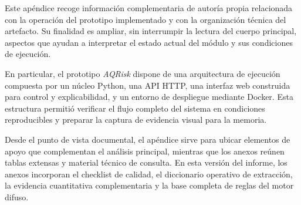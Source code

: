 

Este apéndice recoge información complementaria de autoría propia relacionada con la operación del prototipo implementado y con la organización técnica del artefacto. Su finalidad es ampliar, sin interrumpir la lectura del cuerpo principal, aspectos que ayudan a interpretar el estado actual del módulo y sus condiciones de ejecución.

En particular, el prototipo \textit{AQRisk} dispone de una arquitectura de ejecución compuesta por un núcleo Python, una API HTTP, una interfaz web construida para control y explicabilidad, y un entorno de despliegue mediante Docker. Esta estructura permitió verificar el flujo completo del sistema en condiciones reproducibles y preparar la captura de evidencia visual para la memoria.

Desde el punto de vista documental, el apéndice sirve para ubicar elementos de apoyo que complementan el análisis principal, mientras que los anexos reúnen tablas extensas y material técnico de consulta. En esta versión del informe, los anexos incorporan el checklist de calidad, el diccionario operativo de extracción, la evidencia cuantitativa complementaria y la base completa de reglas del motor difuso.
